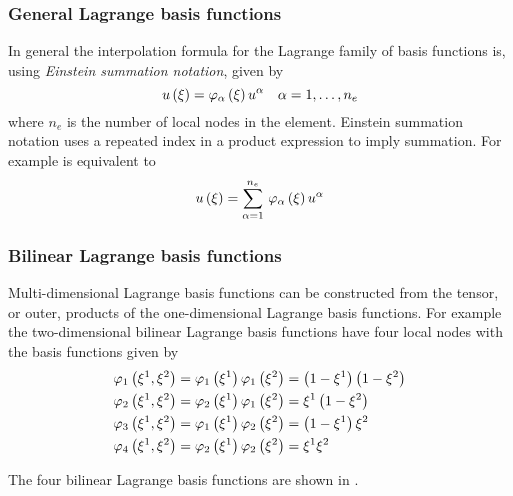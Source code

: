 \subsubsection{General Lagrange basis functions}

In general the interpolation formula for the Lagrange family of basis
functions is, using \emph{Einstein
  summation notation}, given by
\begin{equation}
  \fnof{u}{\xi}=\lbfn{\alpha}{\xi}\nodept{u}{\alpha}\quad \alpha=1,\ldots,n_{e}
  \label{eqn:lagrangeinterpolation}
\end{equation}
where $n_{e}$ is the number of local nodes in the element. Einstein summation
notation uses a repeated index in a product expression to imply summation. For
example  is equivalent to
\begin{equation}
   u\left( \xi \right) =  \displaystyle\sum_{\alpha=1}^{n_{e}} \,   \varphi_{\alpha} \left( \xi \right)   {u}^{\alpha}  
\end{equation}

\subsubsection{Bilinear Lagrange basis functions}

Multi-dimensional Lagrange basis functions can be constructed from the tensor,
or outer, products of the one-dimensional Lagrange basis functions. For
example the two-dimensional bilinear Lagrange basis functions have four local
nodes with the basis functions given by
\begin{equation}
  \begin{split}
       \varphi_{1} \left( \xi^{1},\xi^{2} \right)  &=   \varphi_{1} \left( \xi^{1} \right)     \varphi_{1} \left( \xi^{2} \right)  =
    \left( 1-\xi^{1} \right)\left( 1-\xi^{2} \right)\\
       \varphi_{2} \left( \xi^{1},\xi^{2} \right)  &=   \varphi_{2} \left( \xi^{1} \right)     \varphi_{1} \left( \xi^{2} \right)  =
    \xi^{1}\left( 1-\xi^{2} \right)\\
       \varphi_{3} \left( \xi^{1},\xi^{2} \right)  &=   \varphi_{1} \left( \xi^{1} \right)     \varphi_{2} \left( \xi^{2} \right)  =
    \left( 1-\xi^{1} \right)\xi^{2} \\
       \varphi_{4} \left( \xi^{1},\xi^{2} \right)  &=   \varphi_{2} \left( \xi^{1} \right)     \varphi_{2} \left( \xi^{2} \right)  =
    \xi^{1}\xi^{2}
  \end{split}
\end{equation}

The four \twodal bilinear Lagrange basis functions are shown in .


